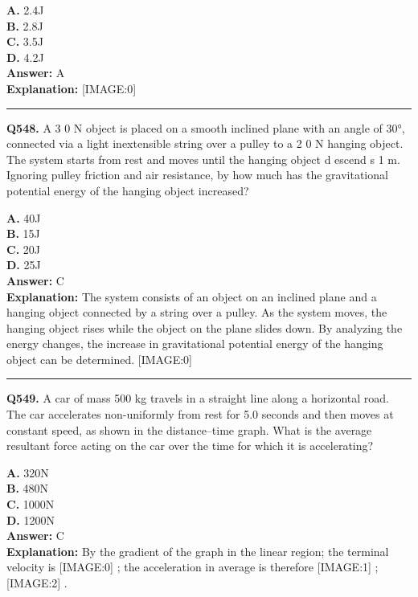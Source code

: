 \documentclass[12pt]{article}
\begin{document}
\textbf{A.} 2.4J \\
\textbf{B.} 2.8J \\
\textbf{C.} 3.5J \\
\textbf{D.} 4.2J \\

\textbf{Answer:} A \\
\textbf{Explanation:} [IMAGE:0]

\hrule
\vspace{1em}


\noindent
\textbf{Q548.} A
3
0 N object is placed on a smooth inclined plane with an angle of 30°, connected via a light inextensible string over a pulley to a
2
0 N hanging object. The system starts from rest and moves until the hanging object
d
escend
s 1
m. Ignoring pulley friction and air resistance, by how much has the gravitational potential energy of the hanging object increased?



\textbf{A.} 40J \\
\textbf{B.} 15J \\
\textbf{C.} 20J \\
\textbf{D.} 25J \\

\textbf{Answer:} C \\
\textbf{Explanation:} The system consists of an object on an inclined plane and a hanging object connected by a string over a pulley. As the system moves, the hanging object rises while the object on the plane slides down. By analyzing the energy changes, the increase in gravitational potential energy of the hanging object can be determined.
[IMAGE:0]

\hrule
\vspace{1em}


\noindent
\textbf{Q549.} A car of mass 500 kg travels in a straight line along a horizontal road.
The car accelerates non-uniformly from rest for 5.0 seconds and then moves at constant speed, as shown in the distance–time graph.
What is the average resultant force acting on the car over the time for which it is accelerating?



\textbf{A.} 320N \\
\textbf{B.} 480N \\
\textbf{C.} 1000N \\
\textbf{D.} 1200N \\

\textbf{Answer:} C \\
\textbf{Explanation:} By the gradient of the graph in the linear region; the terminal velocity is
[IMAGE:0]
; the acceleration in average is therefore
[IMAGE:1]
;
[IMAGE:2]
.
\end{document}
